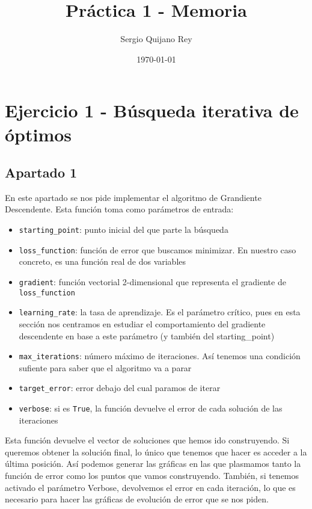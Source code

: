 \documentclass[11pt]{article}
\title{Práctica 1 - Memoria}
\author{Sergio Quijano Rey}
\date{\today}
\begin{document}
\maketitle
\pagebreak

\tableofcontents
\pagebreak

\section{Ejercicio 1 - Búsqueda iterativa de óptimos}

\subsection{Apartado 1}

En este apartado se nos pide implementar el algoritmo de Grandiente Descendente. Esta función toma como parámetros de entrada:

\begin{itemize}
    \item \lstinline{starting_point}: punto inicial del que parte la búsqueda
    \item \lstinline{loss_function}: función de error que buscamos minimizar. En nuestro caso concreto, es una función real de dos variables
    \item \lstinline{gradient}: función vectorial 2-dimensional que representa el gradiente de \lstinline{loss_function}
    \item \lstinline{learning_rate}: la tasa de aprendizaje. Es el parámetro crítico, pues en esta sección nos centramos en estudiar el comportamiento del gradiente descendente en base a este parámetro (y también del starting\_point)
    \item \lstinline{max_iterations}: número máximo de iteraciones. Así tenemos una condición sufiente para saber que el algoritmo va a parar
    \item \lstinline{target_error}: error debajo del cual paramos de iterar
    \item \lstinline{verbose}: si es \lstinline{True}, la función devuelve el error de cada solución de las iteraciones
\end{itemize}

Esta función devuelve el vector de soluciones que hemos ido construyendo. Si queremos obtener la solución final, lo único que tenemos que hacer es acceder a la última posición. Así podemos generar las gráficas en las que plasmamos tanto la función de error como los puntos que vamos construyendo. También, si tenemos activado el parámetro Verbose, devolvemos el error en cada iteración, lo que es necesario para hacer las gráficas de evolución de error que se nos piden.
\end{document}
